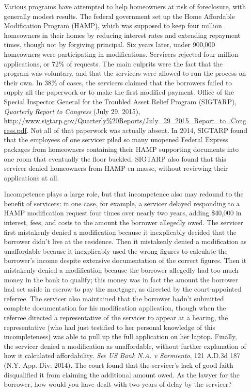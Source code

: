 Various programs have attempted to help homeowners at risk of foreclosure, with
generally modest results. The federal government set up the
Home
Affordable Modification Program (HAMP), which was supposed to keep four
million homeowners in their homes by reducing interest rates and extending
repayment times, though not by forgiving principal. Six years later, under
900,000 homeowners were participating in modifications. Servicers rejected
four million applications, or 72\% of requests. The main culprits were the
fact that the program was voluntary, and that the servicers were allowed to run
the process on their own. In 38\% of cases, the servicers claimed that the
borrowers failed to supply all the paperwork or to make the first modified
payment. Office of the Special Inspector General for the Troubled Asset Relief
Program (SIGTARP), \emph{Quarterly Report to Congress} (July 29, 2015),
\url{http://www.sigtarp.gov/Quarterly\%20Reports/July_29_2015_Report_to_Congress.pdf}.
Not all of that paperwork was actually absent. In 2014, SIGTARP found that the
employees of one servicer piled so many unopened Federal Express packages from
homeowners containing their HAMP supporting documents into one room that
eventually the floor buckled. SIGTARP also found that this servicer denied
homeowners from HAMP en masse, without reviewing their applications at all.

Incompetence plays a large role, but that incompetence also may redound to the
benefit of servicers: in one case, for example, a servicer delayed responding
to a HAMP modification request four times over nearly two years, adding
\$40,000 in interest, fees, and costs to the amount the borrower allegedly
owed. The servicer first mistakenly denied a modification because it
inexplicably decided that the borrower didn't live at the residence. Then it
mistakenly denied a modification as unaffordable because it inexplicably used
the wrong figures to calculate the borrower's income despite extensive
documentation of the correct figures. Then it mistakenly denied a modification
because the borrower allegedly had too much money in the bank to qualify; this
money was in fact the amount the borrower had set aside in escrow to pay the
mortgage, as directed by the court-appointed referree. The servicer also
maintained that the borrower hadn't submitted complete documentation for his
modification application, though when the referree directed a representative of
the servicer to appear at a hearing, the representative (who had just testified
to her personal knowledge of this incompleteness) was able to pull up the full
application on her laptop. Finally, the servicer denied a modification as
unaffordable, without further explanation of how it calculated affordability.
\textit{See} \emph{US Bank N.A. v Sarmiento}, 121 A.D.3d 187 (N.Y. App. Div.
2014). The court found that the servicer's lack of good faith disqualified it
from claiming the additional amount owed. As the lawyer for the borrower, how
would you have dealt with two years of delay by the servicer?

